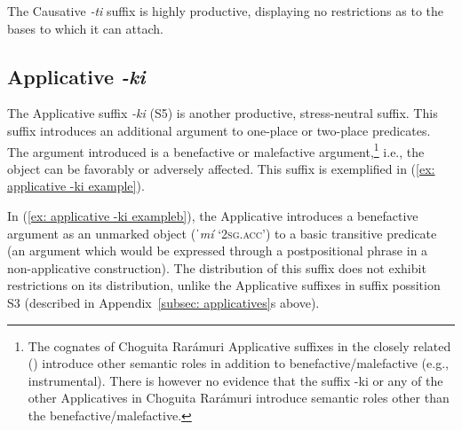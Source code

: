The Causative \textit{-ti} suffix is highly productive, displaying no restrictions as to the bases to which it can attach.

\subsection{Applicative \textit{-ki}}
\label{subsec: applicative ki}

The Applicative suffix \textit{-ki} (S5) is another productive, stress-neutral suffix. This suffix introduces an additional argument to one-place or two-place predicates. The argument introduced is a benefactive or malefactive argument,\footnote{The cognates of Choguita Rarámuri Applicative suffixes in the closely related  (\citealt{miller1996guarijio}) introduce other semantic roles in addition to benefactive/malefactive (e.g., instrumental). There is however no evidence that the suffix -ki or any of the other Applicatives in Choguita Rarámuri introduce semantic roles other than the benefactive/malefactive.} i.e., the object can be favorably or adversely affected. This suffix is exemplified in (\ref{ex: applicative -ki example}).

\ea\label{ex: applicative -ki example}

    \label{ex: applicative -ki examplea}
        \label{ex: applicative -ki exampleb}
    \z
\z

In (\ref{ex: applicative -ki exampleb}), the Applicative introduces a benefactive argument as an unmarked object (\textit{ˈmí} ‘2\textsc{sg.acc}’) to a basic transitive predicate (an argument which would be expressed through a postpositional phrase in a non-applicative construction). The distribution of this suffix does not exhibit restrictions on its distribution, unlike the Applicative suffixes in suffix possition S3 (described in Appendix~\ref{subsec: applicatives}s above).


